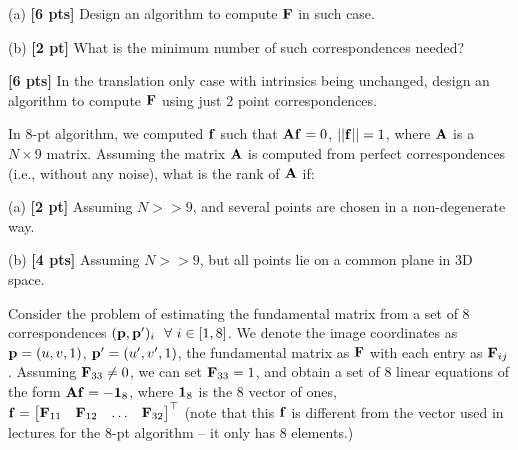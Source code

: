\begin{questions}
    (a) \textbf{[6 pts]} Design an algorithm to compute $\mathbf{F}$ in such case.

    \begin{tcolorbox}[fit,height=5cm, width=\textwidth, blank, borderline={0.5pt}{-2pt},halign=left, valign=center, nobeforeafter]


    \end{tcolorbox}

    (b) \textbf{[2 pt]} What is the minimum number of such correspondences needed?

    \begin{tcolorbox}[fit,height=3cm, width=\textwidth, blank, borderline={0.5pt}{-2pt},halign=left, valign=center, nobeforeafter]


    \end{tcolorbox}

    \question \textbf{[6 pts]} In the translation only case with intrinsics being unchanged, design an algorithm to compute $\mathbf{F}$ using just $2$ point correspondences.

    \begin{tcolorbox}[fit,height=5cm, width=\textwidth, blank, borderline={0.5pt}{-2pt},halign=left, valign=center, nobeforeafter]


    \end{tcolorbox}

    \clearpage

    \question In $8$-pt algorithm, we computed $\mathbf{f}$ such that $\mathbf{A}\mathbf{f} = 0$, $||\mathbf{f}|| = 1$, where $\mathbf{A}$ is a $N \times 9$ matrix. Assuming the matrix $\mathbf{A}$ is computed from perfect correspondences (i.e., without any noise), what is the rank of $\mathbf{A}$ if:

    (a) \textbf{[2 pt]} Assuming $N >> 9$, and several points are chosen in a non-degenerate way.

    \begin{tcolorbox}[fit,height=3cm, width=\textwidth, blank, borderline={0.5pt}{-2pt},halign=left, valign=center, nobeforeafter]
    \end{tcolorbox}

    (b) \textbf{[4 pts]} Assuming $N >> 9$, but all points lie on a common plane in 3D space.

    \begin{tcolorbox}[fit,height=3cm, width=\textwidth, blank, borderline={0.5pt}{-2pt},halign=left, valign=center, nobeforeafter]
    \end{tcolorbox}

    \question Consider the problem of estimating the fundamental matrix from a set of 8 correspondences $(\mathbf{p}, \mathbf{p}^\prime)_i~~\forall~ i \in [1, 8]$. We denote the image coordinates as $\mathbf{p} = (u, v, 1)$, $\mathbf{p}' = (u', v', 1)$, the fundamental matrix as $\mathbf{F}$ with each entry as $\mathbf{F}_{ij}$. Assuming $\mathbf{F}_{33} \neq 0$, we can set $\mathbf{F}_{33} = 1$, and obtain a set of 8 linear equations of the form $\mathbf{A} \mathbf{f} = -\boldsymbol{1}_8$, where $\boldsymbol{1}_8$ is the 8 vector of ones, $\mathbf{f} = \begin{bmatrix} \mathbf{F}_{11} & \mathbf{F}_{12} & \dots & \mathbf{F}_{32} \end{bmatrix}^\top$ (note  that this $\mathbf{f}$ is different from the vector used in lectures for the 8-pt algorithm -- it only has 8 elements.)


\end{questions}
